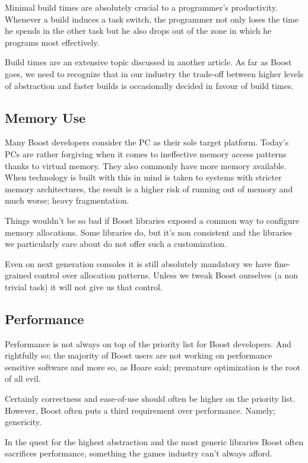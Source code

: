 \documentclass[twocolumn]{paper}
\begin{document}
Minimal build times are absolutely crucial to a programmer's
productivity. Whenever a build induces a task switch, the programmer
not only loses the time he spends in the other task but he also
drops out of the zone in which he programs most effectively.

Build times are an extensive topic discussed in another article. As
far as Boost goes, we need to recognize that in our industry the
trade-off between higher levels of abstraction and faster builds is
occasionally decided in favour of build times.

\subsection{Memory Use}

Many Boost developers consider the PC as their sole target platform.
Today's PCs are rather forgiving when it comes to ineffective memory
access patterns thanks to virtual memory. They also commonly have
more memory available. When technology is built with this in mind is
taken to systems with stricter memory architectures, the result is a
higher risk of running out of memory and much worse; heavy
fragmentation.

Things wouldn't be so bad if Boost libraries exposed a common way to
configure memory allocations. Some libraries do, but it's non
consistent and the libraries we particularly care about do not offer
such a customization.

Even on next generation consoles it is still absolutely mandatory we
have fine-grained control over allocation patterns. Unless we tweak
Boost ourselves (a non trivial task) it will not give us that
control.

\subsection{Performance}

Performance is not always on top of the priority list for Boost
developers. And rightfully so; the majority of Boost users are not
working on performance sensitive software and more so, as Hoare
said; premature optimization is the root of all evil.

Certainly correctness and ease-of-use should often be higher on the
priority list. However, Boost often puts a third requirement over
performance. Namely; genericity.

In the quest for the highest abstraction and the most generic
libraries Boost often sacrifices performance, something the games
industry can't always afford.
\end{document}

